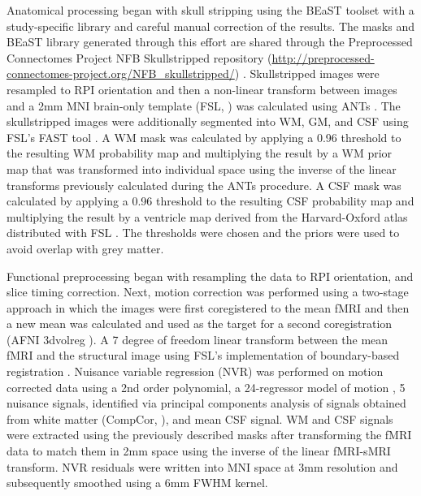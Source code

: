 Anatomical processing began with skull stripping using the BEaST toolset \cite{Eskildsen2012} with a study-specific library and careful manual correction of the results. The masks and BEaST library generated through this effort are shared through the Preprocessed Connectomes Project NFB Skullstripped repository (\url{http://preprocessed-connectomes-project.org/NFB_skullstripped/}) \cite{Puccio2016}. Skullstripped images were resampled to RPI orientation and then a non-linear transform between images and a 2mm MNI brain-only template (FSL, \cite{Smith2004}) was calculated using ANTs \cite{Avants2008}. The skullstripped images were additionally segmented into WM, GM, and CSF using FSL’s FAST tool \cite{Zhang2001}. A WM mask was calculated by applying a 0.96 threshold to the resulting WM probability map and multiplying the result by a WM prior map that was transformed into individual space using the inverse of the linear transforms previously calculated during the ANTs procedure. A CSF mask was calculated by applying a 0.96 threshold to the resulting CSF probability map and multiplying the result by a ventricle map derived from the Harvard-Oxford atlas distributed with FSL \cite{Makris2006}. The thresholds were chosen and the priors were used to avoid overlap with grey matter.

Functional preprocessing began with resampling the data to RPI orientation, and slice timing correction. Next, motion correction was performed using a two-stage approach in which the images were first coregistered to the mean fMRI and then a new mean was calculated and used as the target for a second coregistration (AFNI 3dvolreg \cite{Cox1999}). A 7 degree of freedom linear transform between the mean fMRI and the structural image using FSL’s implementation of boundary-based registration \cite{Greve2009}. Nuisance variable regression (NVR) was performed on motion corrected data using a 2nd order polynomial, a 24-regressor model of motion \cite{Friston1996}, 5 nuisance signals, identified via principal components analysis of signals obtained from white matter (CompCor, \cite{Behzadi2007}), and mean CSF signal. WM and CSF signals were extracted using the previously described masks after transforming the fMRI data to match them in 2mm space using the inverse of the linear fMRI-sMRI transform. NVR residuals were written into MNI space at 3mm resolution and subsequently smoothed using a 6mm FWHM kernel.

